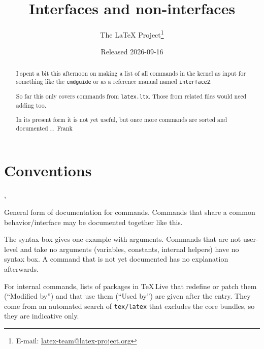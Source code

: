 \documentclass{l3in2edoc}
\begin{document}


\makeatletter
  \edef\conditionally@traceoff{%
    \tracingassigns\z@
    \tracingrestores\z@
    \tracingcommands\z@
    \tracingpages\z@
    \tracingmacros\z@
    \noexpand\ifnum\tracingoutput=\tw@
      \tracingoutput\z@
      \showboxbreadth\m@ne
      \showboxdepth\m@ne
    \noexpand\fi
    \ifdefined\tracingstacklevels \tracingstacklevels\z@ \fi
    \errorcontextlines\m@ne
    \tracingparagraphs\z@
    \tracinggroups\z@
  }
\makeatother

\title{\LaTeXe{} Interfaces and non-interfaces}

\author{%
 The \LaTeX{} Project\thanks
   {%
     E-mail:
       \href{mailto:latex-team@latex-project.org}
         {latex-team@latex-project.org}%
   }%
}

\date{Released 2026-09-16}


\maketitle

\begin{abstract}
  I spent a bit this afternoon on making a list of all \LaTeXe{}
  commands in the kernel as input for something like the
  \texttt{cmdguide} or as a reference manual named
  \texttt{interface2}.

  So far this only covers commands from \texttt{latex.ltx}. Those from
  related files would need adding too.

  In its present form it is not yet useful, but once more commands are
  sorted and documented \ldots\ Frank
\end{abstract}


\tableofcontents

\newpage


\section{Conventions}

\begin{function}[]
  {
    \foo, \foovariant
  }
  \begin{syntax}
      
  \end{syntax}
  General form of documentation for commands. Commands that share a
  common behavior/interface may be documented together like this.

  The syntax box gives one example with arguments. Commands that are
  not user-level and take no arguments (variables, constants,
  internal helpers) have no syntax box. A command that is not yet
  documented has no explanation afterwards.

  For internal commands, lists of packages in \TeX\,Live that redefine
  or patch them (\enquote{Modified by}) and that use them
  (\enquote{Used by}) are given after the entry. They come from an
  automated search of \texttt{tex/latex} that excludes the core
  bundles, so they are indicative only.

\end{function}
\end{document}
